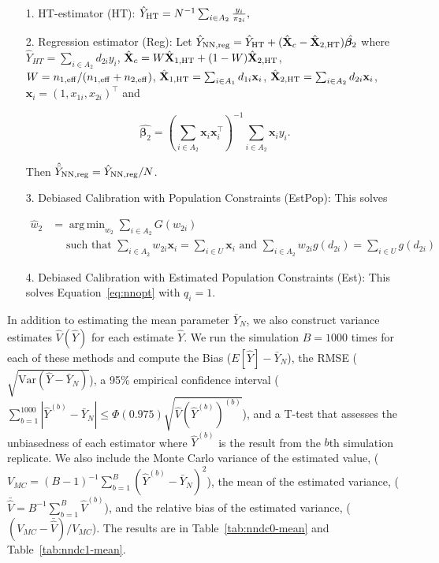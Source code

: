 \documentclass[12pt]{article}
\DeclareMathOperator*{\argmin}{arg\,min}
\newcommand{\Var}{{\text{Var}}}
\renewcommand{\bf}[1]{\mathbf{#1}}
\begin{document}
\begin{itemize}
  \item[1.] HT-estimator (HT): $\hat Y_{\rm HT} = N^{-1} \sum_{i \in A_2}
    \frac{y_i}{\pi_{2i}},$
  \item[2.] Regression estimator (Reg): Let $\hat Y_{\rm NN, reg} = \hat Y_{\rm HT} + (
  \hat{\bf X}_c - \hat{\bf X}_{2, \rm HT}) \hat{\bm \beta_2}$ where $\hat Y_{HT} =
\sum_{i \in A_2} d_{2i} y_i$, $\hat{\bf X}_c = W \hat{\bf X}_{1, \rm HT} + (1 -
W)\hat{\bf X}_{2, \rm HT}$, $W = n_{1,\rm{eff}} / (n_{1,\rm{eff}} + n_{2, \rm{eff}})$,
$\hat{\bf X}_{1, \rm HT} = \sum_{i \in A_1} d_{1i} \bf x_{i}$, $\hat{\bf X}_{2,
    \rm HT} = \sum_{i \in A_2} d_{2i} \bf x_{i}$, $\bf x_i = (1, x_{1i}, x_{2i})^\top$
    and 

    $$ \hat{\bm \beta_2} = \left(\sum_{i \in A_2} \bf x_i \bf x_i^\top\right)^{-1}
    \sum_{i \in A_2} \bf x_i y_i.$$

    Then $\hat{\bar Y}_{\rm NN, reg} = \hat Y_{\rm NN, reg} / N$.
  \item[3.] Debiased Calibration with Population Constraints (EstPop): This 
    solves 

  \begin{align*}
    \hat w_2 &= \argmin_{w_2} \sum_{i \in A_2} G(w_{2i}) \\
    &\quad\text{ such that } 
  \sum_{i \in A_2} w_{2i} \bf x_i = \sum_{i \in U} \bf x_i \text{ and } 
  \sum_{i \in A_2} w_{2i} g(d_{2i}) = \sum_{i \in U} g(d_{2i})
  \end{align*}

  \item[4.] Debiased Calibration with Estimated Population Constraints (Est):
    This solves Equation~\eqref{eq:nnopt} with $q_i = 1$.
\end{itemize}

In addition to estimating the mean parameter $\bar Y_N$, we also construct
variance estimates $\hat V(\hat Y)$ for each estimate $\hat Y$.
We run the simulation $B = 1000$ times for each of these methods and compute the
Bias ($E[\hat Y] - \bar Y_N$), the RMSE ($\sqrt{\Var(\hat Y - \bar Y_N)}$), a 95\%
empirical confidence interval ($\sum_{b = 1}^{1000} |\hat Y^{(b)} - \bar Y_N| \leq 
\Phi(0.975)\sqrt{\hat V(\hat Y^{(b)})^{(b)}}$), and a T-test that assesses the
unbiasedness of each estimator where $\hat Y^{(b)}$ is the result from the $b$th
simulation replicate. We also include the Monte Carlo variance of the estimated
value, ($V_{MC} = (B - 1)^{-1} \sum_{b = 1}^B (\hat Y^{(b)} - \bar Y_N)^2$), the
mean of the estimated variance, 
($\bar{\hat V} = B^{-1} \sum_{b = 1}^B \hat V^{(b)}$), and the relative bias of
the estimated variance, ($(V_{MC} - \bar{\hat V}) / V_{MC}$). The results are in
Table~\ref{tab:nndc0-mean} and Table~\ref{tab:nndc1-mean}.
\end{document}
